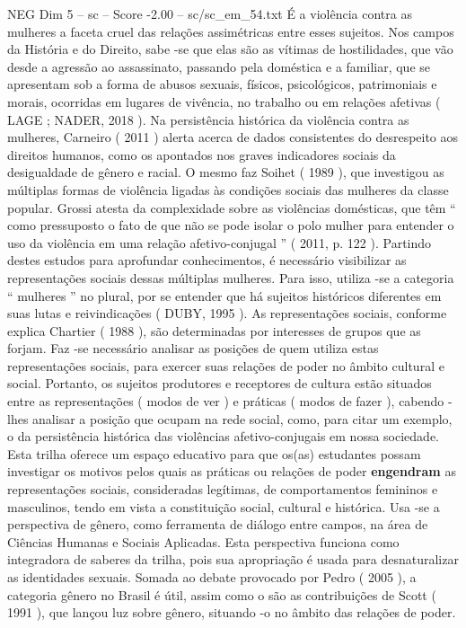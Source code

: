 \begin{textsample}{NEG Dim 5 – sc – Score -2.00 – sc/sc\_em\_54.txt}
É a violência contra as mulheres a faceta cruel das relações assimétricas entre esses sujeitos.
Nos campos da História e do Direito, sabe -se que elas são as vítimas de hostilidades, que vão desde a agressão ao assassinato, passando pela doméstica e a familiar, que se apresentam sob a forma de abusos sexuais, físicos, psicológicos, patrimoniais e morais, ocorridas em lugares de vivência, no trabalho ou em relações afetivas ( LAGE ; NADER, 2018 ).
Na persistência histórica da violência contra as mulheres, Carneiro ( 2011 ) alerta acerca de dados consistentes do desrespeito aos direitos humanos, como os apontados nos graves indicadores sociais da desigualdade de gênero e racial.
O mesmo faz Soihet ( 1989 ), que investigou as múltiplas formas de violência ligadas às condições sociais das mulheres da classe popular.
Grossi atesta da complexidade sobre as violências domésticas, que têm “ como pressuposto o fato de que não se pode isolar o polo mulher para entender o uso da violência em uma relação afetivo-conjugal ” ( 2011, p. 122 ).
Partindo destes estudos para aprofundar conhecimentos, é necessário visibilizar as representações sociais dessas múltiplas mulheres.
Para isso, utiliza -se a categoria “ mulheres ” no plural, por se entender que há sujeitos históricos diferentes em suas lutas e reivindicações ( DUBY, 1995 ).
As representações sociais, conforme explica Chartier ( 1988 ), são determinadas por interesses de grupos que as forjam.
Faz -se necessário analisar as posições de quem utiliza estas representações sociais, para exercer suas relações de poder no âmbito cultural e social.
Portanto, os sujeitos produtores e receptores de cultura estão situados entre as representações ( modos de ver ) e práticas ( modos de fazer ), cabendo -lhes analisar a posição que ocupam na rede social, como, para citar um exemplo, o da persistência histórica das violências afetivo-conjugais em nossa sociedade.
Esta trilha oferece um espaço educativo para que os(as) estudantes possam investigar os motivos pelos quais as práticas ou relações de poder \textbf{engendram} as representações sociais, consideradas legítimas, de comportamentos femininos e masculinos, tendo em vista a constituição social, cultural e histórica.
Usa -se a perspectiva de gênero, como ferramenta de diálogo entre campos, na área de Ciências Humanas e Sociais Aplicadas.
Esta perspectiva funciona como integradora de saberes da trilha, pois sua apropriação é usada para desnaturalizar as identidades sexuais.
Somada ao debate provocado por Pedro ( 2005 ), a categoria gênero no Brasil é útil, assim como o são as contribuições de Scott ( 1991 ), que lançou luz sobre gênero, situando -o no âmbito das relações de poder.

\end{textsample}
